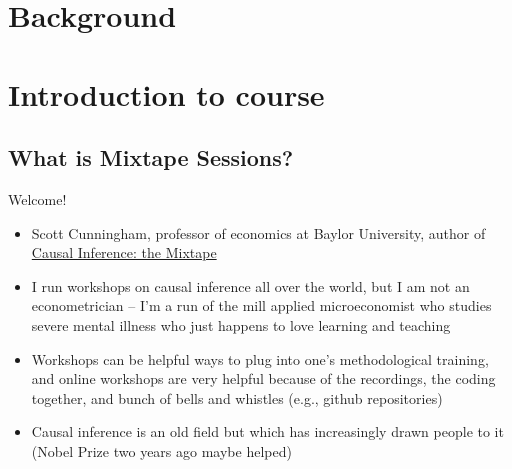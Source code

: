 \documentclass{beamer}
\begin{document}



\section{Background}


\section{Introduction to course}

\subsection{What is Mixtape Sessions?}


\begin{frame}{Welcome!}

  \begin{itemize}
	\item Scott Cunningham, professor of economics at Baylor University, author of \underline{Causal Inference: the Mixtape}
	\item I run workshops on causal inference all over the world, but I am not an econometrician -- I'm a run of the mill applied microeconomist who studies severe mental illness who just happens to love learning and teaching
	\item Workshops can be helpful ways to plug into one's methodological training, and online workshops are very helpful because of the recordings, the coding together, and bunch of bells and whistles (e.g., github repositories)
	\item Causal inference is an old field but which has increasingly drawn people to it (Nobel Prize two years ago maybe helped) 
  \end{itemize}

\end{frame}
\end{document}
